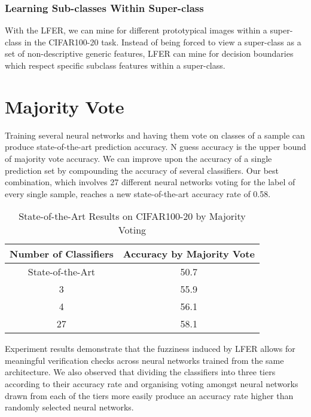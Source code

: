 \documentclass[journal]{journal}
\begin{document}
\subsubsection{Learning Sub-classes Within Super-class}
With the LFER, we can mine for different prototypical images within a super-class in the CIFAR100-20 task. Instead of being forced to view a super-class as a set of non-descriptive generic features, LFER can mine for decision boundaries which respect specific subclass features within a super-class. 

\section{Majority Vote}
Training several neural networks and having them vote on classes of a sample can produce state-of-the-art prediction accuracy. N guess accuracy is the upper bound of majority vote accuracy. We can improve upon the accuracy of a single prediction set by compounding the accuracy of several classifiers. Our best combination, which involves 27 different neural networks voting for the label of every single sample, reaches a new state-of-the-art accuracy rate of 0.58. 

\begin{table}[h]

\begin{center}
\begin{tabular}{|c|c|}
    \hline
       Number of Classifiers & Accuracy by Majority Vote  \\  \hline
       State-of-the-Art & 50.7 \\ 
       3 & 55.9 \\
       4 & 56.1 \\
       27 & 58.1 \\ \hline
\end{tabular}
\end{center}
\label{tab:multicol}
\caption{State-of-the-Art Results on CIFAR100-20 by Majority Voting}
\end{table}

Experiment results demonstrate that the fuzziness induced by LFER allows for meaningful verification checks across neural networks trained from the same architecture. We also observed that dividing the classifiers into three tiers according to their accuracy rate and organising voting amongst neural networks drawn from each of the tiers more easily produce an accuracy rate higher than randomly selected neural networks. 
\end{document}
